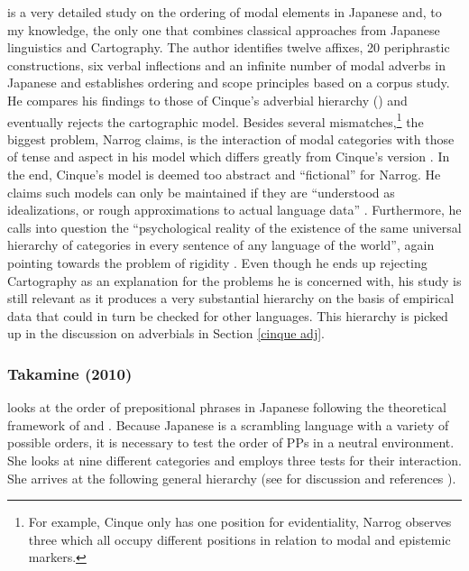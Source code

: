 \citet{narrog:2009:mod} is a very detailed study on the ordering of modal elements in Japanese and, to my knowledge, the only one that combines classical approaches from Japanese linguistics and Cartography. The author identifies twelve affixes, 20 periphrastic constructions, six verbal inflections and an infinite number of modal adverbs in Japanese \citep[71–76]{narrog:2009:mod} and establishes ordering and scope principles based on a corpus study. He compares his findings to those of Cinque’s adverbial hierarchy (\citeyear{cinque:1999:adverbs}) and eventually rejects the cartographic model. Besides several mismatches,\footnote{For example, Cinque only has one position for evidentiality, Narrog observes three which all occupy different positions in relation to modal and epistemic markers.} the biggest problem, Narrog claims, is the interaction of modal categories with those of tense and aspect in his model which differs greatly from Cinque’s version \citep[233–234]{narrog:2009:mod}. In the end, Cinque’s model is deemed too abstract and ``fictional” for Narrog. He claims such models can only be maintained if they are ``understood as idealizations, or rough approximations to actual language data” \citep[243]{narrog:2009:mod}. Furthermore, he calls into question the ``psychological reality of the existence of the same universal hierarchy of categories in every sentence of any language of the world”, again pointing towards the problem of rigidity \citep{larson:2021:rethinking}. Even though he ends up rejecting Cartography as an explanation for the problems he is concerned with, his study is still relevant as it produces a very substantial hierarchy on the basis of empirical data that could in turn be checked for other languages. This hierarchy is picked up in the discussion on adverbials in Section \ref{cinque adj}. 

\subsubsection{Takamine (2010)} \label{takamine}

\citet{takamine:2010:hierarchy} looks at the order of prepositional phrases in Japanese following the theoretical framework of \citet{cinque:1999:adverbs, cinque:2006:complement} and \citet{schweikert:2005:order}. Because Japanese is a scrambling language with a variety of possible orders, it is necessary to test the order of PPs in a neutral environment. She looks at nine different categories and employs three tests for their interaction. She arrives at the following general hierarchy (see for discussion and references \citealt[58--83]{takamine:2010:hierarchy}).

